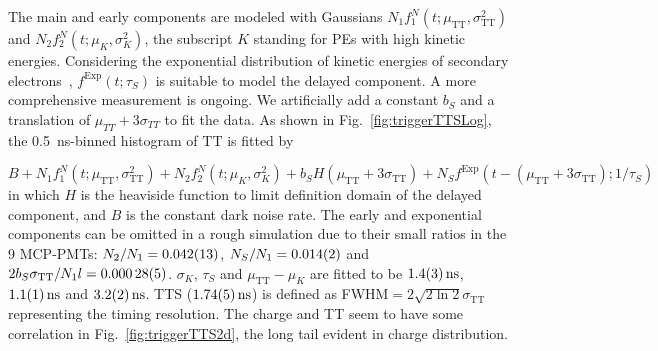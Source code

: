 The main and early components are modeled with Gaussians $N_1f_1^N(t;\mu_{\mathrm{TT}},\sigma_{\mathrm{TT}}^2)$ and $N_2f_2^N(t;\mu_K,\sigma_K^2)$, the subscript $K$ standing for PEs with high kinetic energies. Considering the exponential distribution of kinetic energies of secondary electrons~\cite{Furman,SecondElectron}, $f^\mathrm{Exp}(t;\tau_S)$ is suitable to model the delayed component.  A more comprehensive measurement is ongoing.  We artificially add a constant $b_S$ and a translation of $\mu_{TT} + 3\sigma_{TT}$ to fit the data. As shown in Fig.~\ref{fig:triggerTTSLog}, the \SI{0.5}{ns}-binned histogram of $\mathrm{TT}$ is fitted by

\begin{equation}
    B+N_1f_1^N(t;\mu_{\mathrm{TT}},\sigma_{\mathrm{TT}}^2)+N_2f_2^N(t;\mu_K,\sigma_K^2)+b_SH(\mu_{\mathrm{TT}}+3\sigma_{\mathrm{TT}})+N_Sf^{\mathrm{Exp}}(t-(\mu_{\mathrm{TT}}+3\sigma_{\mathrm{TT}});1/\tau_S)
\end{equation}
in which $H$ is the heaviside function to limit definition domain of the delayed component, and $B$ is the constant dark noise rate. The early and exponential components can be omitted in a rough simulation due to their small ratios in the 9 MCP-PMTs: $N_2/N_1 = \num{0.042\pm0.013}$, $N_S/N_1 = \num{0.014\pm0.002}$ and $2b_S\sigma_{\mathrm{TT}}/N_1 l= \num{0.00028\pm0.00005}$.  $\sigma_K$, $\tau_S$ and $\mu_{\mathrm{TT}}-\mu_K$ are fitted to be $\SI{1.4 \pm 0.3}{ns}$, $\SI{1.1\pm 0.1}{ns}$ and $\SI{3.2\pm 0.2}{ns}$. TTS ($\SI{1.74\pm0.05}{ns}$) is defined as FWHM$=2\sqrt{2\ln 2}\sigma_{\mathrm{TT}}$~\cite{HAMAMATSUManual} representing the timing resolution. The charge and TT seem to have some correlation in Fig.~\ref{fig:triggerTTS2d}, the long tail evident in charge distribution.

